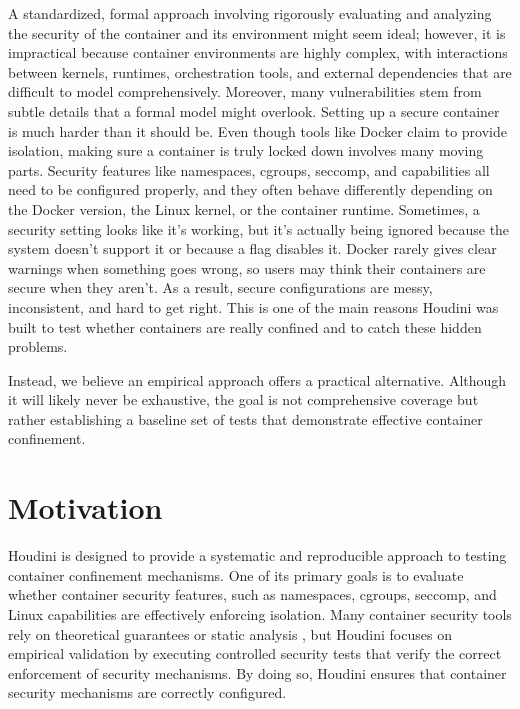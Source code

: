 \documentclass[12pt]{report}
\begin{document}
\begin{doublespace}
A standardized, formal approach involving rigorously evaluating and analyzing the security of the container and its environment might seem ideal; however, it is impractical because container environments are highly complex, with interactions between kernels, runtimes, orchestration tools, and external dependencies that are difficult to model comprehensively. Moreover, many vulnerabilities stem from subtle details that a formal model might overlook. Setting up a secure container is much harder than it should be. Even though tools like Docker claim to provide isolation, making sure a container is truly locked down involves many moving parts. Security features like namespaces, cgroups, seccomp, and capabilities all need to be configured properly, and they often behave differently depending on the Docker version, the Linux kernel, or the container runtime. Sometimes, a security setting looks like it’s working, but it’s actually being ignored because the system doesn’t support it or because a flag disables it. Docker rarely gives clear warnings when something goes wrong, so users may think their containers are secure when they aren’t. As a result, secure configurations are messy, inconsistent, and hard to get right. This is one of the main reasons Houdini was built to test whether containers are really confined and to catch these hidden problems. 

Instead, we believe an empirical approach offers a practical alternative. Although it will likely never be exhaustive, the goal is not comprehensive coverage but rather establishing a baseline set of tests that demonstrate effective container confinement.



\section{Motivation}

Houdini is designed to provide a systematic and reproducible approach to testing container confinement mechanisms. One of its primary goals is to evaluate whether container security features, such as namespaces, cgroups, seccomp, and Linux capabilities are effectively enforcing isolation. Many container security tools rely on theoretical guarantees or static analysis \cite{clair}, but Houdini focuses on empirical validation by executing controlled security tests that verify the correct enforcement of security mechanisms. By doing so, Houdini ensures that container security mechanisms are correctly configured.


\end{doublespace}
\end{document}
